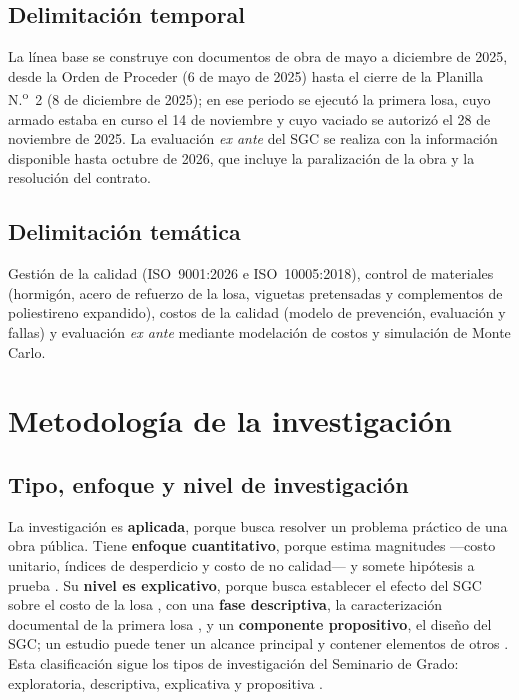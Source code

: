 \subsection{Delimitación temporal}
La línea base se construye con documentos de obra de mayo a diciembre de 2025, desde la Orden de Proceder (6 de mayo de 2025) hasta el cierre de la Planilla N.\textsuperscript{o}~2 (8 de diciembre de 2025); en ese periodo se ejecutó la primera losa, cuyo armado estaba en curso el 14 de noviembre y cuyo vaciado se autorizó el 28 de noviembre de 2025. La evaluación \emph{ex ante} del SGC se realiza con la información disponible hasta octubre de 2026, que incluye la paralización de la obra y la resolución del contrato.

\subsection{Delimitación temática}
Gestión de la calidad (ISO~9001:2026 e ISO~10005:2018), control de materiales (hormigón, acero de refuerzo de la losa, viguetas pretensadas y complementos de poliestireno expandido), costos de la calidad (modelo de prevención, evaluación y fallas) y evaluación \emph{ex ante} mediante modelación de costos y simulación de Monte Carlo.

\section{Metodología de la investigación}

\subsection{Tipo, enfoque y nivel de investigación}
La investigación es \textbf{aplicada}, porque busca resolver un problema práctico de una obra pública. Tiene \textbf{enfoque cuantitativo}, porque estima magnitudes ---costo unitario, índices de desperdicio y costo de no calidad--- y somete hipótesis a prueba \parencite[p.~6]{hernandez2018}. Su \textbf{nivel es explicativo}, porque busca establecer el efecto del SGC sobre el costo de la losa \parencite[p.~110]{hernandez2018}, con una \textbf{fase descriptiva}, la caracterización documental de la primera losa \parencite[p.~108]{hernandez2018}, y un \textbf{componente propositivo}, el diseño del SGC; un estudio puede tener un alcance principal y contener elementos de otros \parencite[p.~113]{hernandez2018}. Esta clasificación sigue los tipos de investigación del Seminario de Grado: exploratoria, descriptiva, explicativa y propositiva \parencite[diapositiva~12]{barrios2021documento}.

